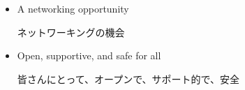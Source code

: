 \documentclass{beamer}
\begin{document}
\begin{frame}
\begin{itemize}
   \item A networking opportunity \\ \begin{CJK}{UTF8}{min}ネットワーキングの機会\end{CJK}
        \smallskip
   
   \item Open, supportive, and safe for all \\ \begin{CJK}{UTF8}{min}皆さんにとって、オープンで、サポート的で、安全\end{CJK}
   
  
  \end{itemize}
  
  \end{frame}
\begin{frame}

\begin{center}
  \end{center}

\end{frame}
\end{document}

